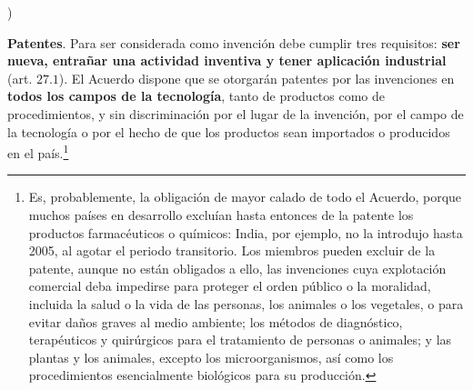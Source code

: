 \documentclass[10pt,a4paper]{article}
\newcounter{alphaitem}
\newenvironment{la}
      {\begin{list}{\alph{alphaitem})}{%
          \usecounter{alphaitem}%
          \setlength{\leftmargin}{1cm}%
          \setlength{\parskip}{3pt}%
          \setlength{\itemsep}{0pt}%
          \setlength{\parsep}{0pt}%
      }}
      {\end{list}}
\begin{document}
\begin{la}
    \item \textbf{Patentes}. Para ser considerada como invención debe cumplir tres requisitos: \textbf{ser nueva, entrañar una actividad inventiva y tener aplicación industrial} (art. $27.1$). El Acuerdo dispone que se otorgarán patentes por las invenciones en \textbf{todos los campos de la tecnología}, tanto de productos como de procedimientos, y sin discriminación por el lugar de la invención, por el campo de la tecnología o por el hecho de que los productos sean importados o producidos en el país.\footnote{%
        Es, probablemente, la obligación de mayor calado de todo el Acuerdo, porque muchos países en desarrollo excluían hasta entonces de la patente los productos farmacéuticos o químicos: India, por ejemplo, no la introdujo hasta 2005, al agotar el periodo transitorio. Los miembros pueden excluir de la patente, aunque no están obligados a ello, las invenciones cuya explotación comercial deba impedirse para proteger el orden público o la moralidad, incluida la salud o la vida de las personas, los animales o los vegetales, o para evitar daños graves al medio ambiente; los métodos de diagnóstico, terapéuticos y quirúrgicos para el tratamiento de personas o animales; y las plantas y los animales, excepto los microorganismos, así como los procedimientos esencialmente biológicos para su producción. 
        
}
\end{la}
\end{document}

